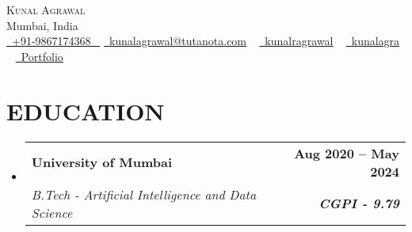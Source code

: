 \documentclass[letterpaper,11pt]{article}
\makeatletter
\newcommand{\resumeItem}[1]{
  \item\small{
    {#1 \vspace{-2pt}}
  }
}
\newcommand{\resumeSubheading}[4]{
  \vspace{-2pt}\item
    \begin{tabular*}{1.0\textwidth}[t]{l@{\extracolsep{\fill}}r}
      \textbf{\large#1} & \textbf{\small #2} \\
      \textit{\large#3} & \textit{\small #4} \\
      
    \end{tabular*}\vspace{-7pt}
}
\newcommand{\resumeSubHeadingListStart}{\begin{itemize}[leftmargin=0.0in, label={}]}
\newcommand{\resumeSubHeadingListEnd}{\end{itemize}}
\makeatother
\begin{document}


\begin{center}
    {\Huge \scshape {Kunal Agrawal}} \\ \vspace{1pt}
    Mumbai, India \\ \vspace{1pt}
    \small \href{tel:+919867174368}{ \raisebox{-0.1\height}{\faPhone*}\ \underline{+91-9867174368} ~} \href{mailto:kunalagrawal@tutanota.com}{\raisebox{-0.2\height}{\faEnvelope[regular]}\  \underline{kunalagrawal@tutanota.com}} ~ 
    \href{https://linkedin.com/in/kunalragrawal}{\raisebox{-0.2\height}\faLinkedinIn\ \underline{kunalragrawal}}  ~
    \href{https://github.com/kunalagra}{\raisebox{-0.2\height}\faGithub\ \underline{kunalagra}} ~
    \href{https://kunalagrawal.vercel.app/}{\raisebox{-0.2\height}{\faLink}\ \underline{Portfolio}}
    \vspace{-8pt}
\end{center}


\section{EDUCATION}
  \resumeSubHeadingListStart
    \resumeSubheading
      {University of Mumbai}{Aug 2020 -- May 2024}
      {B.Tech - Artificial Intelligence and Data Science}{\textbf{CGPI - 9.79}}
  
      
  \resumeSubHeadingListEnd
  

\end{document}
